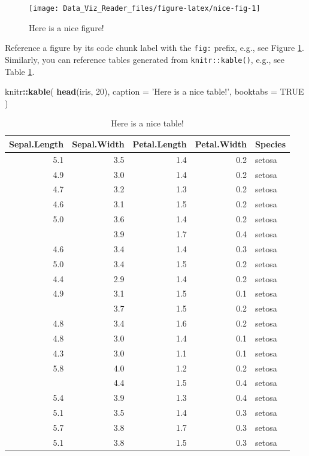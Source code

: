 \documentclass[]{book}
\newenvironment{Shaded}{\begin{snugshade}}{\end{snugshade}}
\newcommand{\KeywordTok}[1]{\textcolor[rgb]{0.13,0.29,0.53}{\textbf{#1}}}
\newcommand{\DataTypeTok}[1]{\textcolor[rgb]{0.13,0.29,0.53}{#1}}
\newcommand{\DecValTok}[1]{\textcolor[rgb]{0.00,0.00,0.81}{#1}}
\newcommand{\StringTok}[1]{\textcolor[rgb]{0.31,0.60,0.02}{#1}}
\newcommand{\OtherTok}[1]{\textcolor[rgb]{0.56,0.35,0.01}{#1}}
\newcommand{\OperatorTok}[1]{\textcolor[rgb]{0.81,0.36,0.00}{\textbf{#1}}}
\newcommand{\NormalTok}[1]{#1}
\theoremstyle{definition}
\theoremstyle{definition}
\theoremstyle{definition}
\theoremstyle{remark}
\begin{document}
\begin{figure}

{\centering \texttt{[image: Data\_Viz\_Reader\_files/figure-latex/nice-fig-1]} 

}

\caption{Here is a nice figure!}\label{fig:nice-fig}
\end{figure}

Reference a figure by its code chunk label with the \texttt{fig:}
prefix, e.g., see Figure \ref{fig:nice-fig}. Similarly, you can
reference tables generated from \texttt{knitr::kable()}, e.g., see Table
\ref{tab:nice-tab}.

\begin{Shaded}
\begin{Highlighting}[]
\NormalTok{knitr}\OperatorTok{::}\KeywordTok{kable}\NormalTok{(}
  \KeywordTok{head}\NormalTok{(iris, }\DecValTok{20}\NormalTok{), }\DataTypeTok{caption =} \StringTok{'Here is a nice table!'}\NormalTok{,}
  \DataTypeTok{booktabs =} \OtherTok{TRUE}
\NormalTok{)}
\end{Highlighting}
\end{Shaded}

\begin{table}

\caption{\label{tab:nice-tab}Here is a nice table!}
\centering
\begin{tabular}[t]{rrrrl}
\toprule
Sepal.Length & Sepal.Width & Petal.Length & Petal.Width & Species\\
\midrule
5.1 & 3.5 & 1.4 & 0.2 & setosa\\
4.9 & 3.0 & 1.4 & 0.2 & setosa\\
4.7 & 3.2 & 1.3 & 0.2 & setosa\\
4.6 & 3.1 & 1.5 & 0.2 & setosa\\
5.0 & 3.6 & 1.4 & 0.2 & setosa\\
\addlinespace
5.4 & 3.9 & 1.7 & 0.4 & setosa\\
4.6 & 3.4 & 1.4 & 0.3 & setosa\\
5.0 & 3.4 & 1.5 & 0.2 & setosa\\
4.4 & 2.9 & 1.4 & 0.2 & setosa\\
4.9 & 3.1 & 1.5 & 0.1 & setosa\\
\addlinespace
5.4 & 3.7 & 1.5 & 0.2 & setosa\\
4.8 & 3.4 & 1.6 & 0.2 & setosa\\
4.8 & 3.0 & 1.4 & 0.1 & setosa\\
4.3 & 3.0 & 1.1 & 0.1 & setosa\\
5.8 & 4.0 & 1.2 & 0.2 & setosa\\
\addlinespace
5.7 & 4.4 & 1.5 & 0.4 & setosa\\
5.4 & 3.9 & 1.3 & 0.4 & setosa\\
5.1 & 3.5 & 1.4 & 0.3 & setosa\\
5.7 & 3.8 & 1.7 & 0.3 & setosa\\
5.1 & 3.8 & 1.5 & 0.3 & setosa\\
\bottomrule
\end{tabular}
\end{table}
\end{document}

